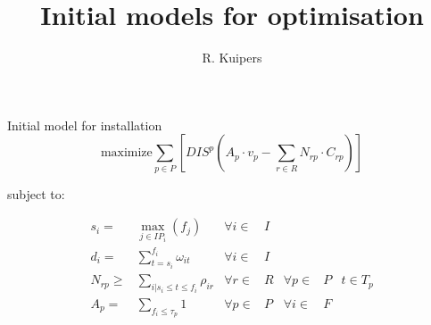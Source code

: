 \documentclass{beamer}
\title[Initial models for optimisation]{Initial models for optimisation}
\author{R. Kuipers}
\begin{document}
\begin{frame}
  \titlepage
\end{frame}


\begin{frame}{Initial model for installation}
\begin{equation}
	\text{maximize} \sum_{p \in P} [ DIS^p (A_p \cdot v_p - \sum_{r \in R} N_{rp} \cdot C_{rp}) ]
\end{equation}

\bigskip
subject to:

\begin{align}
s_i =& \max_{j \in IP_i}(f_j)				&	\forall i \in& I 									\\
d_i =& \sum_{t = s_i}^{f_i} \omega_{it} 		& 	\forall i \in& I 									\\
N_{rp} \geq& \sum_{i | s_i \leq t \leq f_i} \rho_{ir}	& 	\forall r \in& R   	&	\forall p \in& P 	&	t \in T_p  		\\
A_p =&  \sum_{ f_i \leq \tau_p} 1   			&	\forall p \in& P         	&	\forall i \in& F
\end{align}

\end{frame}
\end{document}
